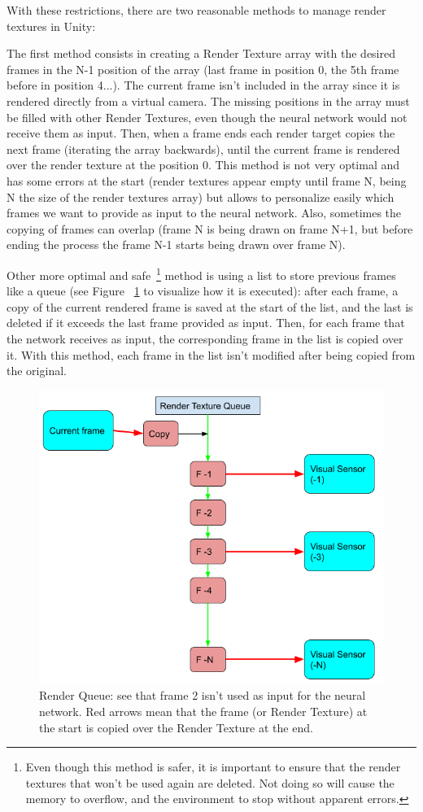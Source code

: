 With these restrictions, there are two reasonable methods to manage render textures in Unity:

The first method consists in creating a Render Texture array with the desired frames in the N-1 position of the array (last frame in position 0, the 5th frame before in position 4...). The current frame isn't included in the array since it is rendered directly from a virtual camera. The missing positions in the array must be filled with other Render Textures, even though the neural network would not receive them as input. Then, when a frame ends each render target copies the next frame (iterating the array backwards), until the current frame is rendered over the render texture at the position 0.
This method is not very optimal and has some errors at the start (render textures appear empty until frame N, being N the size of the render textures array) but allows to personalize easily which frames we want to provide as input to the neural network. Also, sometimes the copying of frames can overlap (frame N is being drawn on frame N+1, but before ending the process the frame N-1 starts being drawn over frame N).

Other more optimal and safe~\footnote{Even though this method is safer, it is important to ensure that the render textures that won't be used again are deleted. Not doing so will cause the memory to overflow, and the environment to stop without apparent errors.} method is using a list to store previous frames like a queue (see Figure ~\ref{fig:renderqueue} to visualize how it is executed): after each frame, a copy of the current rendered frame is saved at the start of the list, and the last is deleted if it exceeds the last frame provided as input. Then, for each frame that the network receives as input, the corresponding frame in the list is copied over it. With this method, each frame in the list isn't modified after being copied from the original.

\begin{figure}[h]
  \centering
		\includegraphics[width=.9\textwidth]{img/renderqueue.png}
  \caption{Render Queue: see that frame 2 isn't used as input for the neural network. Red arrows mean that the frame (or Render Texture) at the start is copied over the Render Texture at the end.}
  \label{fig:renderqueue}
\end{figure}

